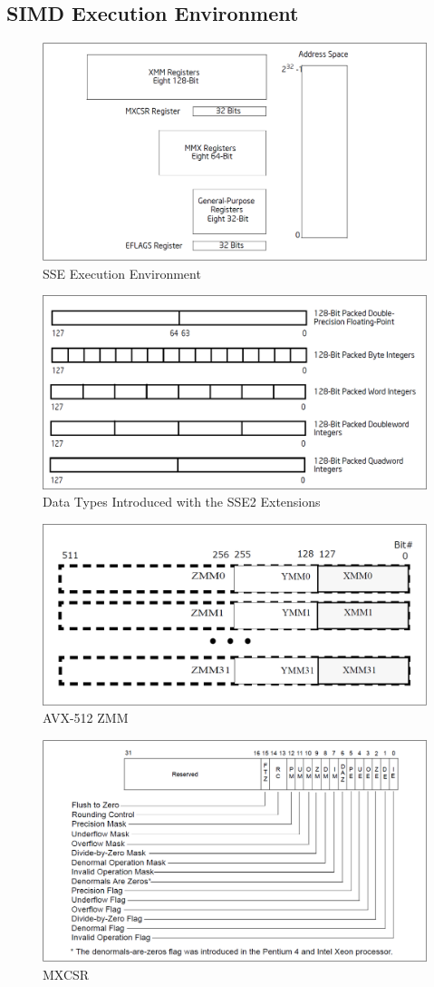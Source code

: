 \documentclass{article}
\begin{document}
\subsection{SIMD Execution Environment}
\begin{figure}[H]
	\centering
	\includegraphics[width = .7\textwidth]{SSE_Execution_Environment.png}
	\caption{SSE Execution Environment}
\end{figure}
\begin{figure}[H]
	\centering
	\includegraphics[width = .7\textwidth]{Data_Types_Introduced_with_the_SSE2_Extensions.png}
	\caption{Data Types Introduced with the SSE2 Extensions}
\end{figure}
\begin{figure}[H]
	\centering
	\includegraphics[width = .8\textwidth]{ZMM.png}
	\caption{AVX-512 ZMM}
\end{figure}
\begin{figure}[H]
	\centering
	\includegraphics[width = .8\textwidth]{MXCSR.png}
	\caption{MXCSR}
\end{figure}
\end{document}

